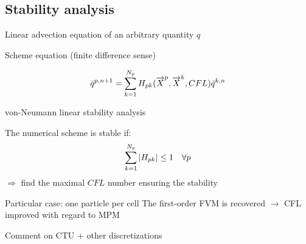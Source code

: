 \subsection{Stability analysis}
\begin{frame}{Linear advection equation of an arbitrary quantity $q$}%
  \begin{block}{Scheme equation (finite difference sense)}
    \begin{footnotesize}
      \begin{equation*}
        \bar{q}^{p,n+1}=\sum_{k=1}^{N_p}H_{pk}({\overrightarrow{X}}^p,{\overrightarrow{X}}^k,CFL)\bar{q}^{k,n}
      \end{equation*}
    \end{footnotesize}
  \end{block}
  \begin{block}{von-Neumann linear stability analysis}
    \begin{footnotesize}
      The numerical scheme is stable if:
      \begin{equation*}
        \sum_{k=1}^{N_p}\left\vert H_{pk}\right\vert \leq 1 \quad \forall p
      \end{equation*}
      \alert{$\Rightarrow$ find the maximal $CFL$ number ensuring the stability}
    \end{footnotesize}
  \end{block}\pause
  \begin{footnotesize}
    \begin{block}{Particular case: one particle per cell}
      The first-order FVM is recovered $\rightarrow$ CFL improved with regard to MPM 
    \end{block}
    Comment on CTU + other discretizations
  \end{footnotesize}
\end{frame}


